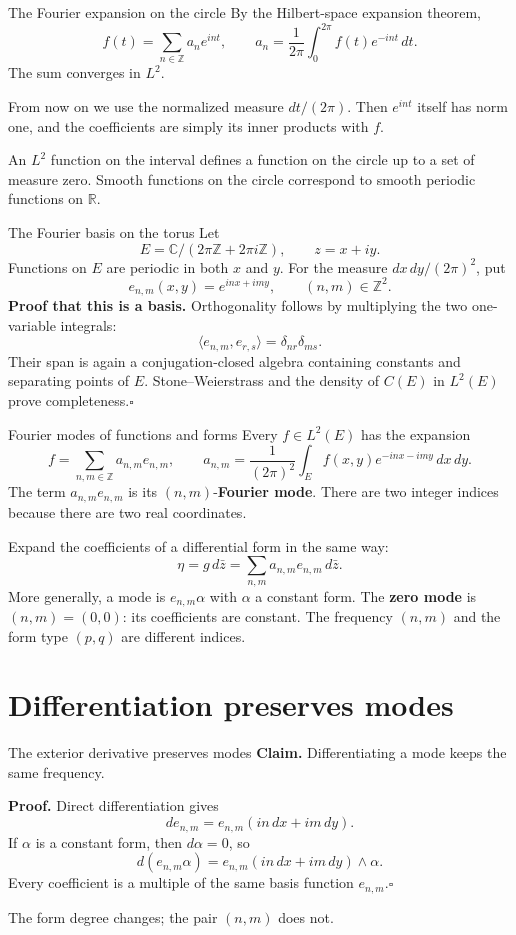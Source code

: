 \documentclass[aspectratio=169,11pt]{beamer}
\newcommand{\C}{\mathbb C}
\newcommand{\R}{\mathbb R}
\newcommand{\Z}{\mathbb Z}
\newcommand{\ee}{e_{n,m}}
\begin{document}
\begin{frame}{The Fourier expansion on the circle}
By the Hilbert-space expansion theorem,
\[
 f(t)=\sum_{n\in\Z}a_n e^{int},\qquad
 a_n=\frac1{2\pi}\int_0^{2\pi}f(t)e^{-int}\,dt.
\]
The sum converges in $L^2$.

From now on we use the normalized measure $dt/(2\pi)$.
Then $e^{int}$ itself has norm one, and the coefficients are simply
its inner products with $f$.

An $L^2$ function on the interval defines a function on the circle
up to a set of measure zero. Smooth functions on the circle correspond
to smooth periodic functions on $\R$.
\end{frame}

\begin{frame}{The Fourier basis on the torus}
Let
\[
 E=\C/(2\pi\Z+2\pi i\Z),\qquad z=x+iy.
\]
Functions on $E$ are periodic in both $x$ and $y$.
For the measure $dx\,dy/(2\pi)^2$, put
\[
 \ee(x,y)=e^{inx+imy},\qquad(n,m)\in\Z^2.
\]
\textbf{Proof that this is a basis.} Orthogonality follows by multiplying
the two one-variable integrals:
\[
 \langle e_{n,m},e_{r,s}\rangle=\delta_{nr}\delta_{ms}.
\]
Their span is again a conjugation-closed algebra containing constants
and separating points of $E$. Stone--Weierstrass and the density of
$C(E)$ in $L^2(E)$ prove completeness.\hfill$\square$
\end{frame}

\begin{frame}{Fourier modes of functions and forms}
Every $f\in L^2(E)$ has the expansion
\[
 f=\sum_{n,m\in\Z}a_{n,m}\ee,\qquad
 a_{n,m}=\frac1{(2\pi)^2}\int_E f(x,y)e^{-inx-imy}\,dx\,dy.
\]
The term $a_{n,m}\ee$ is its $(n,m)$-\textbf{Fourier mode}.
There are two integer indices because there are two real coordinates.

Expand the coefficients of a differential form in the same way:
\[
 \eta=g\,d\bar z=\sum_{n,m}a_{n,m}\ee\,d\bar z.
\]
More generally, a mode is $\ee\alpha$ with $\alpha$ a constant form.
The \textbf{zero mode} is $(n,m)=(0,0)$: its coefficients are constant.
The frequency $(n,m)$ and the form type $(p,q)$ are different indices.
\end{frame}

\section{Differentiation preserves modes}
\begin{frame}{The exterior derivative preserves modes}
\textbf{Claim.} Differentiating a mode keeps the same frequency.

\textbf{Proof.} Direct differentiation gives
\[
 d\ee=\ee(in\,dx+im\,dy).
\]
If $\alpha$ is a constant form, then $d\alpha=0$, so
\[
 d(\ee\alpha)=\ee(in\,dx+im\,dy)\wedge\alpha.
\]
Every coefficient is a multiple of the same basis function $\ee$.\hfill$\square$

The form degree changes; the pair $(n,m)$ does not.
\end{frame}
\end{document}
